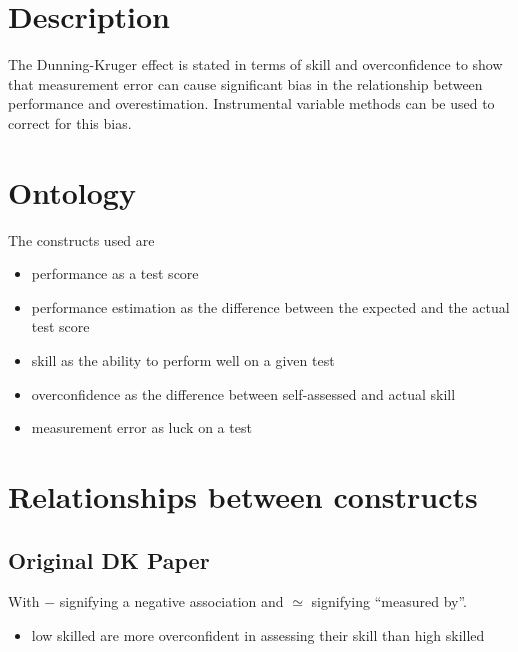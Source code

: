 \documentclass[a4paper,11pt]{article}
\newcommand{\1}{\mathbf{1}}
\begin{document}
\section{Description}
The Dunning-Kruger effect is stated in terms of skill and overconfidence to show that measurement error can cause significant bias in the relationship between performance and overestimation.
Instrumental variable methods can be used to correct for this bias.

\section{Ontology}
The constructs used are
\begin{itemize}
 \item performance as a test score
 \item performance estimation as the difference between the expected and the actual test score
 \item skill as the ability to perform well on a given test
 \item overconfidence as the difference between self-assessed and actual skill
 \item measurement error as luck on a test
\end{itemize}

\section{Relationships between constructs}

\subsection{Original DK Paper}

\begin{figure}[H]
  \vspace{1cm}
  \begin{center}
  
  \end{center}
  \label{fig:typetree}
\end{figure}

With $-$ signifying a negative association and $\simeq$ signifying ``measured by''.

\begin{itemize}
 \item low skilled are more overconfident in assessing their skill than high skilled
\end{itemize}
\end{document}
